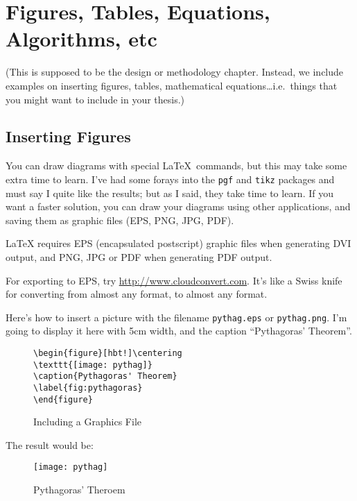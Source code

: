 \chapter{Figures, Tables, Equations, Algorithms, etc}\label{chap:design}


(This is supposed to be the design or methodology chapter.  Instead, we include examples on inserting figures, tables, mathematical equations\ldots i.e.\ things that you might want to include in your thesis.)

\section{Inserting Figures}\label{sec:figure}

You can draw diagrams with special \LaTeX\ commands, but this may take some extra time to learn.  I've had some forays into the \texttt{pgf} and \texttt{tikz} packages and must say I quite like the results; but as I said, they take time to learn. If you want a faster solution, you can draw your diagrams using other applications, and saving them as graphic files (EPS, PNG, JPG, PDF).  

\LaTeX{} requires EPS (encapsulated postscript) graphic files when generating DVI output, and PNG, JPG or PDF when generating PDF output.

For exporting to EPS, try \url{http://www.cloudconvert.com}. It's like a Swiss knife for converting from almost any format, to almost any format.

Here's how to insert a picture with the filename \verb|pythag.eps| or \verb|pythag.png|.  I'm going to display it here with 5cm width, and the caption ``Pythagoras' Theorem''.

\begin{figure}[hbt!]
\begin{lstlisting}
\begin{figure}[hbt!]\centering
\texttt{[image: pythag]}
\caption{Pythagoras' Theorem}
\label{fig:pythagoras}
\end{figure}
\end{lstlisting}
\caption{Including a Graphics File}\label{fig:lst:graphics}
\end{figure}

The result would be:

\begin{figure}[hbt!]\centering
\texttt{[image: pythag]}
\caption{Pythagoras' Theroem} \label{fig:pythagoras}
\end{figure}

